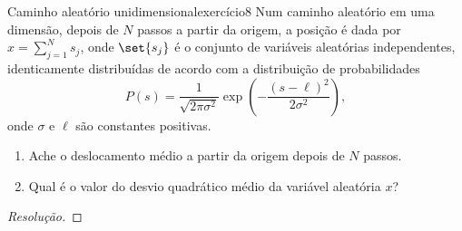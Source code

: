 \begin{exercício}{Caminho aleatório unidimensional}{exercício8}
    Num caminho aleatório em uma dimensão, depois de \(N\) passos a partir da origem, a posição é dada por \(x = \sum_{j=1}^N s_j\), onde \(\set{s_j}\) é o conjunto de variáveis aleatórias independentes, identicamente distribuídas de acordo com a distribuição de probabilidades
    \begin{equation*}
        P(s) = \frac{1}{\sqrt{2\pi \sigma^2}} \exp{\left(-\frac{(s - \ell)^2}{2 \sigma^2}\right)},
    \end{equation*}
    onde \(\sigma\) e \(\ell\) são constantes positivas.
    \begin{enumerate}[label=(\alph*)]
        \item Ache o deslocamento médio a partir da origem depois de \(N\) passos.
        \item Qual é o valor do desvio quadrático médio da variável aleatória \(x\)?
    \end{enumerate}
\end{exercício}
\begin{proof}[Resolução]

\end{proof}


